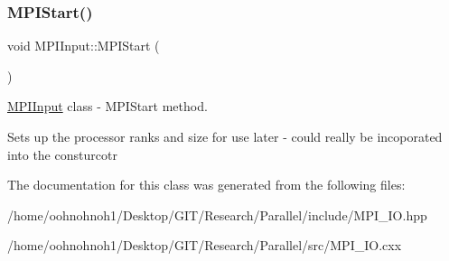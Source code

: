 \subsubsection{\texorpdfstring{M\+P\+I\+Start()}{MPIStart()}}
{\footnotesize\ttfamily void M\+P\+I\+Input\+::\+M\+P\+I\+Start (\begin{DoxyParamCaption}{ }\end{DoxyParamCaption})}



\hyperlink{classMPIInput}{M\+P\+I\+Input} class -\/ M\+P\+I\+Start method. 

Sets up the processor ranks and size for use later -\/ could really be incoporated into the consturcotr 

The documentation for this class was generated from the following files\+:\begin{DoxyCompactItemize}
\item 
/home/oohnohnoh1/\+Desktop/\+G\+I\+T/\+Research/\+Parallel/include/M\+P\+I\+\_\+\+I\+O.\+hpp\item 
/home/oohnohnoh1/\+Desktop/\+G\+I\+T/\+Research/\+Parallel/src/M\+P\+I\+\_\+\+I\+O.\+cxx\end{DoxyCompactItemize}
